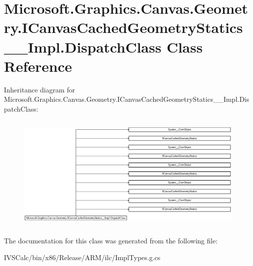 \hypertarget{class_microsoft_1_1_graphics_1_1_canvas_1_1_geometry_1_1_i_canvas_cached_geometry_statics_____impl_1_1_dispatch_class}{}\section{Microsoft.\+Graphics.\+Canvas.\+Geometry.\+I\+Canvas\+Cached\+Geometry\+Statics\+\_\+\+\_\+\+Impl.\+Dispatch\+Class Class Reference}
\label{class_microsoft_1_1_graphics_1_1_canvas_1_1_geometry_1_1_i_canvas_cached_geometry_statics_____impl_1_1_dispatch_class}
Inheritance diagram for Microsoft.\+Graphics.\+Canvas.\+Geometry.\+I\+Canvas\+Cached\+Geometry\+Statics\+\_\+\+\_\+\+Impl.\+Dispatch\+Class\+:\begin{figure}[H]
\begin{center}
\leavevmode
\includegraphics[height=5.724907cm]{class_microsoft_1_1_graphics_1_1_canvas_1_1_geometry_1_1_i_canvas_cached_geometry_statics_____impl_1_1_dispatch_class}
\end{center}
\end{figure}


The documentation for this class was generated from the following file\+:\begin{DoxyCompactItemize}
\item 
I\+V\+S\+Calc/bin/x86/\+Release/\+A\+R\+M/ilc/Impl\+Types.\+g.\+cs\end{DoxyCompactItemize}
